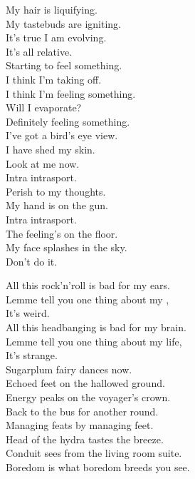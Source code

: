My hair is liquifying. \\
My tastebuds are igniting. \\
It's true I am evolving. \\
It's all relative. \\

Starting to feel something. \\
I think I'm taking off. \\
I think I'm feeling something. \\
Will I evaporate? \\
Definitely feeling something. \\
I've got a bird's eye view. \\
I have shed my skin. \\
Look at me now. \\

Intra intrasport. \\
Perish to my thoughts. \\
My hand is on the gun. \\
Intra intrasport. \\
The feeling's on the floor. \\
My face splashes in the sky. \\

Don't do it. \\





All this rock'n'roll is bad for my ears. \\
Lemme tell you one thing about my , \\
It's weird. \\
All this headbanging is bad for my brain. \\
Lemme tell you one thing about my life, \\
It's strange. \\

Sugarplum fairy dances now. \\
Echoed feet on the hallowed ground. \\
Energy peaks on the voyager's crown. \\
Back to the bus for another round. \\
Managing feats by managing feet. \\
Head of the hydra tastes the breeze. \\
Conduit sees from the living room suite. \\
Boredom is what boredom breeds you see. \\

